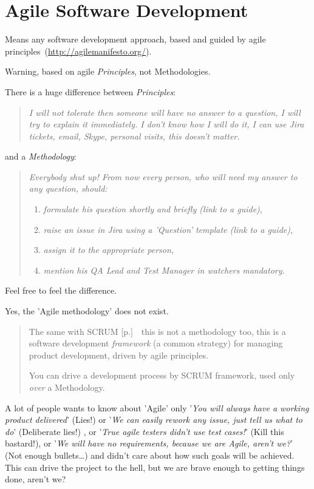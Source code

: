\section{Agile Software Development}
\label{sec:Agile Software Development}

Means any software development approach, based and guided by agile principles~(\url{http://agilemanifesto.org/}).

Warning, based on agile \emph{Principles}, not Methodologies. 

There is a huge difference between \emph{Principles}:
\begin{quote}
\textit{I will not tolerate then someone will have no answer to a question, I will try to explain it immediately. I don't know how I will do it, I can use Jira tickets, email, Skype, personal visits, this doesn't matter.}
\end{quote} 
and a \emph{Methodology}:
\begin{quote}
\textit{Everybody shut up! From now every person, who will need my answer to any question, should:}
\begin{enumerate}
\item \textit{formulate his question shortly and briefly (link to a guide)},
\item \textit{raise an issue in Jira using a 'Question' template (link to a guide)},
\item \textit{assign it to the appropriate person,}
\item \textit{mention his QA Lead and Test Manager in watchers mandatory.}
\end{enumerate}
\end{quote} 

Feel free to feel the difference.

Yes, the 'Agile methodology' does not exist.

\begin{quote}
The same with SCRUM [p.\pageref{sec:SCRUM}]~\textemdash~this is not a methodology too, this is a software development \emph{framework} (a common strategy) for managing product development, driven by agile principles. 

You can drive a development process by SCRUM framework, used only \emph{over} a Methodology.
\end{quote} 

A lot of people wants to know about 'Agile' only '\textit{You will always have a working product delivered}' (Lies!) or '\textit{We can easily rework any issue, just tell us what to do}' (Deliberate lies!) , or '\textit{True agile testers didn't use test cases!}' (Kill this bastard!), or '\textit{We will have no requirements, because we are Agile, aren't we?}' (Not enough bullets\ldots) and didn't care about how such goals will be achieved. This can drive the project to the hell, but we are brave enough to getting things done, aren't we?
